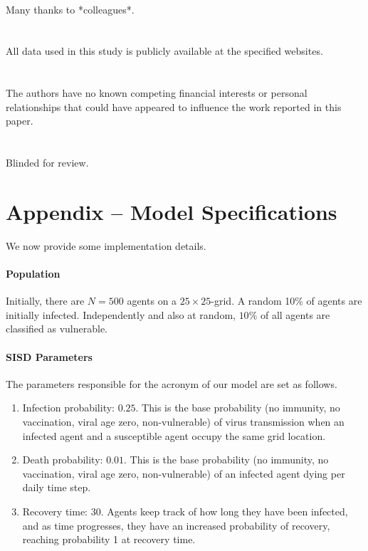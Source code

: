 \documentclass[a4paper,12pt]{article}
\begin{document}
\theendnotes

\\
Many thanks to *colleagues*.\\%
\\
\\
All data used in this study is publicly available at the specified websites.\\
\\
\\
The authors have no known competing financial interests or personal relationships that could have appeared to influence the work reported in this paper.\\
\\
\\
Blinded for review. %

\printbibliography
%


\newpage
\section*{Appendix -- Model Specifications}
We now provide some implementation details.

\paragraph{Population} Initially, there are $N=500$ agents on a $25\times25$-grid. A random 10\% of agents are initially infected. Independently and also at random, $10\%$ of all agents are classified as vulnerable.

\paragraph{SISD Parameters} The parameters responsible for the acronym of our model are set as follows.
\begin{enumerate}
    \item Infection probability: $0.25$. This is the base probability (no immunity, no vaccination, viral age zero, non-vulnerable) of virus transmission when an infected agent and a susceptible agent occupy the same grid location.
    \item Death probability: $0.01$. This is the base probability (no immunity, no vaccination, viral age zero, non-vulnerable) of an infected agent dying per daily time step.
    \item Recovery time: $30$. Agents keep track of how long they have been infected, and as time progresses, they have an increased probability of recovery, reaching probability 1 at recovery time.
\end{enumerate}
\end{document}
